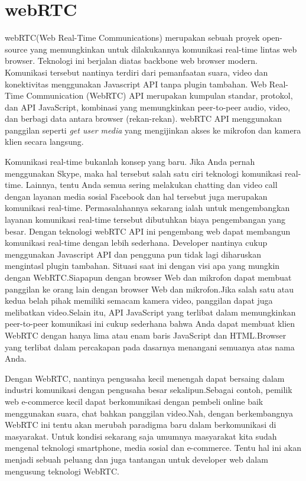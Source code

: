\documentclass{jtetiproposalskripsi}
\begin{document}
\section{webRTC}
webRTC(Web Real-Time Communications) merupakan sebuah proyek open-source yang memungkinkan untuk dilakukannya komunikasi real-time lintas web browser. Teknologi ini berjalan diatas backbone web browser modern. Komunikasi tersebut nantinya terdiri dari pemanfaatan suara, video dan konektivitas menggunakan Javascript API tanpa plugin tambahan. Web Real-Time Communication (WebRTC) API merupakan kumpulan standar, protokol, dan API JavaScript, kombinasi yang memungkinkan peer-to-peer audio, video, dan berbagi data antara browser (rekan-rekan). webRTC API menggunakan panggilan seperti \emph{get user media} yang mengijinkan akses ke mikrofon dan kamera klien secara langsung.

Komunikasi real-time bukanlah konsep yang baru. Jika Anda pernah menggunakan Skype, maka hal tersebut salah satu ciri teknologi komunikasi real-time. Lainnya, tentu Anda semua sering melakukan chatting dan video call dengan layanan media sosial Facebook dan hal tersebut juga merupakan komunikasi real-time.
Permasalahannya sekarang ialah untuk mengembangkan layanan komunikasi real-time tersebut dibutuhkan biaya pengembangan yang besar. Dengan teknologi webRTC API ini pengembang web dapat membangun komunikasi real-time dengan lebih sederhana. Developer nantinya cukup menggunakan Javascript API dan pengguna pun tidak lagi diharuskan mengintasl plugin tambahan. Situasi saat ini dengan visi apa yang mungkin dengan WebRTC.Siapapun dengan browser Web dan mikrofon dapat membuat panggilan ke orang lain dengan browser Web dan mikrofon.Jika salah satu atau kedua belah pihak memiliki semacam kamera video, panggilan dapat juga melibatkan video.Selain itu, API JavaScript yang terlibat dalam memungkinkan peer-to-peer komunikasi ini cukup sederhana bahwa Anda dapat membuat klien WebRTC dengan hanya lima atau enam baris JavaScript dan HTML.Browser yang terlibat dalam percakapan pada dasarnya menangani semuanya atas nama Anda.

Dengan WebRTC, nantinya pengusaha kecil menengah dapat bersaing dalam industri komunikasi dengan pengusaha besar sekalipun.Sebagai contoh, pemilik web e-commerce kecil dapat berkomunikasi dengan pembeli online baik menggunakan suara, chat bahkan panggilan video.Nah, dengan berkembangnya WebRTC ini tentu akan merubah paradigma baru dalam berkomunikasi di masyarakat. Untuk kondisi sekarang saja umumnya masyarakat kita sudah mengenal teknologi smartphone, media sosial dan e-commerce. Tentu hal ini akan menjadi sebuah peluang dan juga tantangan untuk developer web dalam mengusung teknologi WebRTC.
\end{document}
